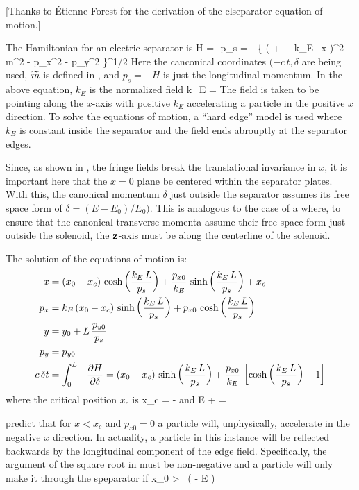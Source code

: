 [Thanks to \'Etienne Forest for the derivation of the elseparator equation of motion.]

The Hamiltonian for an electric separator is 
\Begineq
  H = -p_s 
  = - \left\{ \left(  + \delta + k_E \, x \right)^2 - 
  \wt m^2 - p_x^2 - p_y^2 \right\}^{1/2}
  \label{hp1b}
\Endeq
Here the canconical coordinates $(-c \, t, \delta$ are being used,
$\widetilde m$ is defined in , and $p_s = -H$ is just the
longitudinal momentum.  In the above equation, $k_E$ is the normalized
field
\Begineq
  k_E = 
\Endeq
The field is taken to be pointing along the $x$-axis with positive
$k_E$ accelerating a particle in the positive $x$ direction. To solve
the equations of motion, a ``hard edge'' model is used where $k_E$ is
constant inside the separator and the field ends abrouptly at the
separator edges.

Since, as shown in , the fringe fields break the
translational invariance in $x$, it is important here that the $x = 0$
plane be centered within the separator plates. With this, the
canonical momentum $\delta$ just outside the separator assumes its
free space form of $\delta = (E - E_0) / E_0)$. This is analogous to
the case of a  where, to ensure that the canonical
transverse momenta assume their free space form just outside the
solenoid, the ${\bf z}$-axis must be along the centerline of the
solenoid.

The solution of the equations of motion is:
\begin{align}
  x   &= (x_0 - x_c) \, \cosh \left( \frac{k_E \, L}{p_s} \right) + 
         \frac{p_{x0}}{k_E} \, \sinh \left( \frac{k_E \, L}{p_s} \right) + x_c \nonumber \\
  p_x &= k_E \, (x_0 - x_c) \, \sinh \left( \frac{k_E \, L}{p_s} \right) + 
         {p_{x0}} \, \cosh \left( \frac{k_E \, L}{p_s} \right) \nonumber \\
  y   &= y_0 + L \, \frac{p_{y0}}{p_s} \label{xxlp} \\
  p_y &= p_{y0} \nonumber \\
  c \, \delta t &=  \int_0^L -\frac{\partial H}{\partial \delta}
      = (x_0 - x_c) \, \sinh \left( \frac{k_E \, L}{p_s} \right) +
        \frac{p_{x0}}{k_E} \, \left[ \cosh \left( \frac{k_E \, L}{p_s} \right) - 1 \right]
        \nonumber
\end{align}
where the critical position $x_c$ is
\Begineq 
  x_c = -
\Endeq
and 
\Begineq
  \wt E \equiv {} + \delta = 
\Endeq
 
 predict that for $x < x_c$ and $p_{x0} = 0$ a particle
will, unphysically, accelerate in the negative $x$ direction. In
actuality, a particle in this instance will be reflected backwards by
the longitudinal component of the edge field. Specifically, the
argument of the square root in  must be non-negative and
a particle will only make it through the speparator if
\Begineq
  x_0 >  \, \left(  - \wt E \right)
\Endeq

